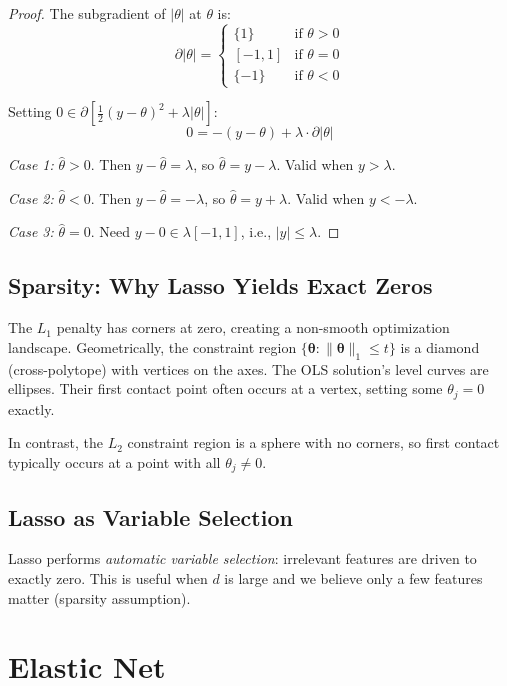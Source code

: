 \documentclass[main.tex]{subfiles}
\begin{document}
\begin{proof}
The subgradient of $|\theta|$ at $\theta$ is:
$$\partial|\theta| = \begin{cases}
\{1\} & \text{if } \theta > 0 \\
[-1, 1] & \text{if } \theta = 0 \\
\{-1\} & \text{if } \theta < 0
\end{cases}$$

Setting $0 \in \partial\left[\frac{1}{2}(y-\theta)^2 + \lambda|\theta|\right]$:
$$0 = -(y - \theta) + \lambda \cdot \partial|\theta|$$

\textit{Case 1:} $\hat{\theta} > 0$. Then $y - \hat{\theta} = \lambda$, so $\hat{\theta} = y - \lambda$. Valid when $y > \lambda$.

\textit{Case 2:} $\hat{\theta} < 0$. Then $y - \hat{\theta} = -\lambda$, so $\hat{\theta} = y + \lambda$. Valid when $y < -\lambda$.

\textit{Case 3:} $\hat{\theta} = 0$. Need $y - 0 \in \lambda[-1, 1]$, i.e., $|y| \leq \lambda$.
\end{proof}

\subsection{Sparsity: Why Lasso Yields Exact Zeros}

The $L_1$ penalty has corners at zero, creating a non-smooth optimization landscape. Geometrically, the constraint region $\{\boldsymbol{\theta} : \|\boldsymbol{\theta}\|_1 \leq t\}$ is a diamond (cross-polytope) with vertices on the axes. The OLS solution's level curves are ellipses. Their first contact point often occurs at a vertex, setting some $\theta_j = 0$ exactly.

In contrast, the $L_2$ constraint region is a sphere with no corners, so first contact typically occurs at a point with all $\theta_j \neq 0$.

\subsection{Lasso as Variable Selection}

Lasso performs \textit{automatic variable selection}: irrelevant features are driven to exactly zero. This is useful when $d$ is large and we believe only a few features matter (sparsity assumption).

\needspace{0.33\textheight}
\section{Elastic Net}
\end{document}
